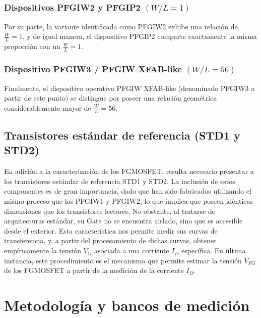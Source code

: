 \documentclass[12pt,a4paper,oneside]{book}
\begin{document}
\subsection{Dispositivos PFGIW2 y PFGIP2 $(W/L=1)$}
Por su parte, la variante identificada como PFGIW2 exhibe una relación de $\frac{W}{L}=1$, y de igual manera, el dispositivo PFGIP2 comparte exactamente la misma proporción con un $\frac{W}{L}=1$.

\subsection{Dispositivo PFGIW3 / PFGIW XFAB-like $(W/L=56)$}
Finalmente, el dispositivo operativo PFGIW XFAB-like (denominado PFGIW3 a partir de este punto) se distingue por poseer una relación geométrica considerablemente mayor de $\frac{W}{L}=56$.

\section{Transistores estándar de referencia (STD1 y STD2)}
En adición a la caracterización de los FGMOSFET, resulta necesario presentar a los transistores estándar de referencia STD1 y STD2. La inclusión de estos componentes es de gran importancia, dado que han sido fabricados utilizando el mismo proceso que los PFGIW1 y PFGIW2, lo que implica que poseen idénticas dimensiones que los transistores lectores. No obstante, al tratarse de arquitecturas estándar, su Gate no se encuentra aislado, sino que es accesible desde el exterior. Esta característica nos permite medir sus curvas de transferencia, y, a partir del procesamiento de dichas curvas, obtener empíricamente la tensión $V_{G}$ asociada a una corriente $I_D$ específica. En última instancia, este procedimiento es el mecanismo que permite estimar la tensión $V_{FG}$ de los FGMOSFET a partir de la medición de la corriente $I_D$.

\chapter{Metodología y bancos de medición}
\end{document}
